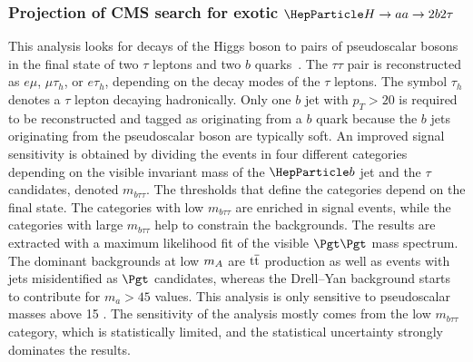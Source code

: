 \subsubsection[C. Caillol]{Projection of CMS search for exotic $\PH\to aa \to 2b 2\tau$}\label{Sec:9.1.3}
This analysis looks for decays of the Higgs boson to pairs of pseudoscalar bosons in the final state of two
$\tau$ leptons and two $b$ quarks~\cite{Sirunyan:2018pzn}. The $\tau\tau$ pair is reconstructed as $e\mu$, $\mu\tau_h$, or $e\tau_h$, depending on the decay modes of the $\tau$ leptons. The symbol $\tau_h$ denotes a $\tau$ lepton decaying hadronically.
Only one $b$ jet with $p_T>20$ \UGeV is required to be reconstructed and tagged as originating from a $b$ quark
because the $b$ jets originating from the pseudoscalar boson are typically soft.
An improved signal sensitivity is obtained by dividing the events in four different
categories depending on the visible invariant mass of the $\PQb$ jet and the $\tau$ candidates, denoted $m_{b\tau\tau}$.
 The thresholds that define the categories depend on the final state.
The categories with low $m_{b\tau\tau}$ are enriched in signal events, while the categories with large $m_{b\tau\tau}$ help to
constrain the backgrounds. The results are extracted with a maximum likelihood fit of the visible $\Pgt\Pgt$ mass spectrum.
The dominant backgrounds at low $m_{A}$ are $\text{t}\overline{\text{t}}$ production as well as events with jets misidentified as $\Pgt$
candidates, whereas the Drell--Yan background starts to contribute for $m_a>45$ \UGeV values. This analysis
is only sensitive to pseudoscalar masses above 15 \UGeV. The sensitivity of the analysis mostly comes from the low $m_{b\tau\tau}$
category, which is statistically limited, and the statistical uncertainty strongly dominates the results.

